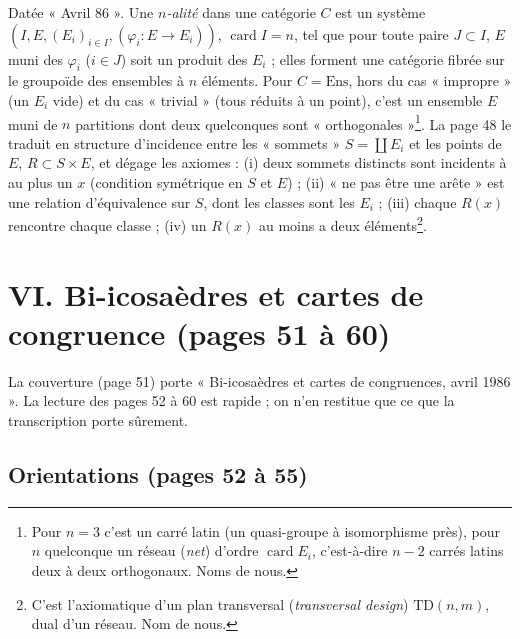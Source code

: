 \documentclass[11pt,a4paper]{article}
\begin{document}
Datée « Avril 86 ». Une \emph{$n$-alité} dans une catégorie $C$ est un système
$(I, E, (E_i)_{i \in I}, (\varphi_i : E \to E_i))$, $\operatorname{card} I =
n$, tel que pour toute paire $J \subset I$, $E$ muni des $\varphi_i$ ($i \in
J$) soit un produit des $E_i$ ; elles forment une catégorie fibrée sur le
groupoïde des ensembles à $n$ éléments. Pour $C = \mathrm{Ens}$, hors du cas
« impropre » (un $E_i$ vide) et du cas « trivial » (tous réduits à un point),
c'est un ensemble $E$ muni de $n$ partitions dont deux quelconques sont
« orthogonales »\footnote{Pour $n = 3$ c'est un carré latin (un quasi-groupe à
isomorphisme près), pour $n$ quelconque un réseau (\emph{net}) d'ordre
$\operatorname{card}E_i$, c'est-à-dire $n - 2$ carrés latins deux à deux
orthogonaux. Noms de nous.}. La page 48 le traduit en structure d'incidence
entre les « sommets » $S = \coprod E_i$ et les points de $E$, $R \subset S
\times E$, et dégage les axiomes : (i) deux sommets distincts sont incidents à
au plus un $x$ (condition symétrique en $S$ et $E$) ; (ii) « ne pas être une
arête » est une relation d'équivalence sur $S$, dont les classes sont les
$E_i$ ; (iii) chaque $R(x)$ rencontre chaque classe ; (iv) un $R(x)$ au moins a
deux éléments\footnote{C'est l'axiomatique d'un plan transversal
(\emph{transversal design}) $\mathrm{TD}(n, m)$, dual d'un réseau. Nom de nous.}.

\section*{VI. Bi-icosaèdres et cartes de congruence (pages 51 à 60)}

La couverture (page 51) porte « Bi-icosaèdres et cartes de congruences, avril
1986 ». La lecture des pages 52 à 60 est rapide ; on n'en restitue que ce que
la transcription porte sûrement.

\subsection*{Orientations (pages 52 à 55)}
\end{document}
